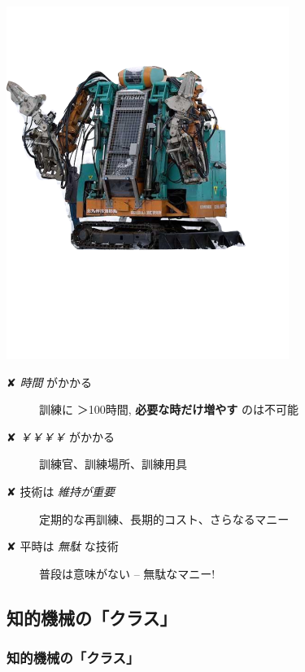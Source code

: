 \begin{container-fluid}
\begin{row-fluid}
\begin{span4}
\includegraphics{img/rescue/1.png}
\end{span4}
\begin{span8}


\begin{description}
\item[{✘ \emph{時間} がかかる}] 訓練に ＞100時間, \textbf{必要な時だけ増やす} のは不可能
\item[{✘ \emph{￥￥￥￥} がかかる}] 訓練官、訓練場所、訓練用具
\item[{✘ 技術は \emph{維持が重要}}] 定期的な再訓練、長期的コスト、さらなるマニー
\item[{✘ 平時は \emph{無駄} な技術}] 普段は意味がない -- 無駄なマニー!
\end{description}
\end{span8}
\end{row-fluid}
\end{container-fluid}

\subsection{知的機械の「クラス」}
\label{sec:orgheadline14}

\subsubsection{知的機械の「クラス」}
\label{sec:orgheadline11}

